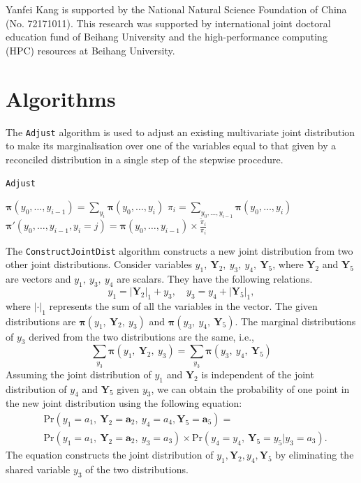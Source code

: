 \documentclass[a4paper,review,11pt,authoryear]{elsarticle}
\let\code=\texttt
\newcommand{\bY}{\mathbf{Y}}
\newcommand{\bpi}{\bm{\pi}}
\theoremstyle{definition}
\begin{document}
Yanfei Kang is supported by the National Natural Science Foundation of China (No. 72171011). This research was supported by international joint doctoral
education fund of Beihang University and the high-performance computing (HPC) resources at Beihang University.



\newpage

\appendix

\section{Algorithms}
\label{appendix:adjust}

The \code{Adjust} algorithm is used to adjust an existing multivariate joint distribution to make its marginalisation over one of the variables equal to that given by a reconciled distribution in a single step of the stepwise procedure.

\begin{algorithm}[H]
  \label{alg:adjust}
  \caption{\code{Adjust}}
  \Input{$\bpi(y_0,y_1,\dots,y_i), \tilde\pi_i, y_i \in \{0,1,\dots,k_i\}$}

  $\bpi(y_0,\dots,y_{i-1}) = \sum_{y_i}\bpi(y_0,\dots,y_i)$\;
  $\pi_i = \sum_{y_0,\dots,y_{i-1}}\bpi(y_0,\dots,y_i)$ \;
   {
    $\bpi'(y_0,\dots,y_{i-1}, y_i=j) = \bpi(y_0,\dots,y_{i-1}) \times \frac{\tilde\pi_i}{\pi_i}$ \;
  }

  \Output{$\bpi'(y_0,\dots,y_i)$}

 \end{algorithm}


 The \code{ConstructJointDist} algorithm constructs a new joint distribution from two other joint distributions.
 Consider variables $y_1, ~ \bY_2, ~ y_3, ~ y_4, ~ \bY_5$, where $\bY_2$ and $\bY_5$ are vectors and $y_1, ~ y_3, ~ y_4$ are scalars.
 They have the following relations.
 \[
  y_1 = |\bY_2|_1 + y_3, \quad y_3 = y_4 + |\bY_5|_1,
 \]
 where $|\cdot|_1$ represents the sum of all the variables in the vector.
 The given distributions are $\bpi(y_1, ~ \bY_2, ~ y_3)$ and $\bpi(y_3, ~ y_4, ~ \bY_5)$.
 The marginal distributions of $y_3$ derived from the two distributions are the same, i.e.,
 \[
  \sum_{y_3} \bpi(y_1, ~ \bY_2, ~ y_3) = \sum_{y_3}\bpi(y_3, ~ y_4, ~ \bY_5)
\]
 Assuming the joint distribution of $y_1$ and $\bY_2$ is independent of the joint distribution of $y_4$ and $\bY_5$ given $y_3$, we can obtain the probability of one point in the new joint distribution using the following equation: \[
   \begin{aligned}
  &\text{Pr}(y_1=a_1, ~ \bY_2=\mathbf{a}_2, ~ y_4=a_4, \bY_5 = \mathbf{a}_5) =\\ &\text{Pr} (y_1=a_1, ~ \bY_2=\mathbf{a}_2, ~ y_3=a_3) \times \text{Pr}(y_4=y_4, ~ \bY_5=y_5|y_3=a_3).
   \end{aligned}
 \]
 The equation constructs the joint distribution of $y_1, \bY_2, y_4, \bY_5$ by eliminating the shared variable $y_3$ of the two distributions.


\newpage
\begingroup
{}


\endgroup
\end{document}
